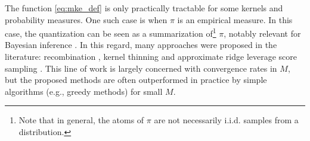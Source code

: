 The function \eqref{eq:mke_def} is only practically tractable for some kernels and probability measures. One such case is when $\pi$ is an empirical measure. In this case, the quantization can be seen as a summarization of\footnote{Note that in general, the atoms of $\pi$ are not necessarily i.i.d. samples from a distribution.} $\pi$, notably relevant for Bayesian inference \cite{Owe17,RiChCoSwNiMaOa22}. In this regard, many approaches were proposed in the literature: recombination \cite{HaObLy22, HaObLy23}, kernel thinning \cite{DwMa21,DwMa24} and approximate ridge leverage score sampling \cite{ChScDeRo23}. This line of work is largely concerned with convergence rates in $M$, but the proposed methods are often outperformed in practice by simple algorithms (e.g., greedy methods) for small $M$.



























